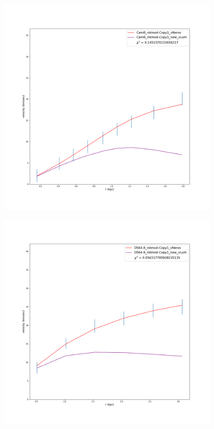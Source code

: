 \documentclass[reprint,%
 amsmath,amssymb,
 aps,
]{revtex4-1}
\begin{document}
\begin{figure}
\centering
\begin{minipage}{.5\textwidth}
  \centering
  \includegraphics[width=.95\linewidth]{Updated_Graphs_withnewcolorsandfonts/CamB_rotmod-Copy1_XueSofue.png}
  \label{fig:test1}
\end{minipage}%
\begin{minipage}{.5\textwidth}
  \centering
  \includegraphics[width=.95\linewidth]{Updated_Graphs_withnewcolorsandfonts/D564-8_rotmod-Copy1_XueSofue.png}

\end{minipage}
\end{figure}
\end{document}
